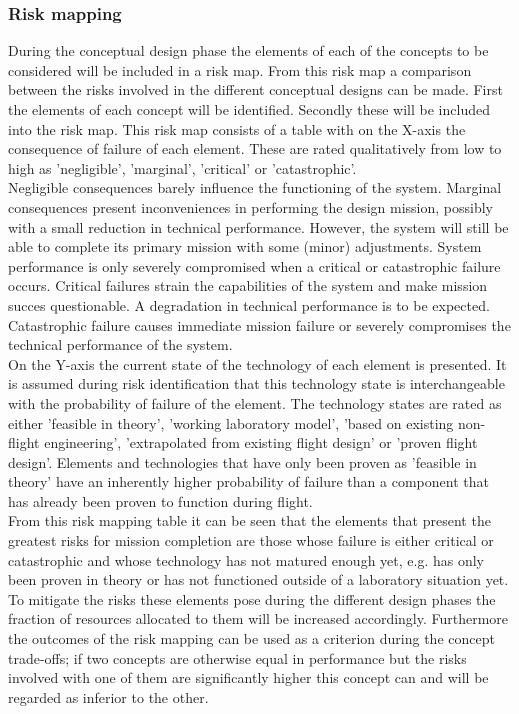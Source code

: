 \subsubsection{Risk mapping}
\label{subsec:riskmap}
During the conceptual design phase the elements of each of the concepts to be considered will be included in a risk map. From this risk map a comparison between the risks involved in the different conceptual designs can be made. First the elements of each concept will be identified. Secondly these will be included into the risk map. This risk map consists of a table with on the X-axis the consequence of failure of each element. These are rated qualitatively from low to high as 'negligible', 'marginal', 'critical' or 'catastrophic'. \\
\noindent Negligible consequences barely influence the functioning of the system. Marginal consequences present inconveniences in performing the design mission, possibly with a small reduction in technical performance. However, the system will still be able to complete its primary mission with some (minor) adjustments. System performance is only severely compromised when a critical or catastrophic failure occurs. Critical failures strain the capabilities of the system and make mission succes questionable. A degradation in technical performance is to be expected. Catastrophic failure causes immediate mission failure or severely compromises the technical performance of the system. \\
\noindent On the Y-axis the current state of the technology of each element is presented. It is assumed during risk identification that this technology state is interchangeable with the probability of failure of the element. The technology states are rated as either 'feasible in theory', 'working laboratory model', 'based on existing non-flight engineering', 'extrapolated from existing flight design' or 'proven flight design'. Elements and technologies that have only been proven as 'feasible in theory' have an inherently higher probability of failure than a component that has already been proven to function during flight. \\
\noindent From this risk mapping table it can be seen that the elements that present the greatest risks for mission completion are those whose failure is either critical or catastrophic and whose technology has not matured enough yet, e.g. has only been proven in theory or has not functioned outside of a laboratory situation yet. To mitigate the risks these elements pose during the different design phases the fraction of resources allocated to them will be increased accordingly.
Furthermore the outcomes of the risk mapping can be used as a criterion during the concept trade-offs; if two concepts are otherwise equal in performance but the risks involved with one of them are significantly higher this concept can and will be regarded as inferior to the other.

